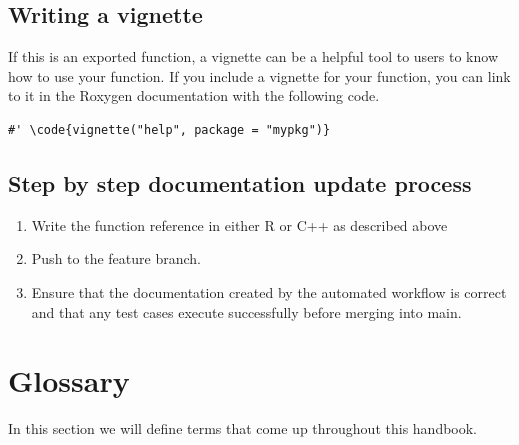 \documentclass[
]{book}
\begin{document}
\hypertarget{writing-a-vignette}{%
\section{Writing a vignette}\label{writing-a-vignette}}

If this is an exported function, a vignette can be a helpful tool to users to know how to use your function.
If you include a vignette for your function, you can link to it in the Roxygen documentation with the following code.

\begin{verbatim}
#' \code{vignette("help", package = "mypkg")}
\end{verbatim}

\hypertarget{step-by-step-documentation-update-process}{%
\section{Step by step documentation update process}\label{step-by-step-documentation-update-process}}

\begin{enumerate}
\def\labelenumi{\arabic{enumi}.}
\item
  Write the function reference in either R or C++ as described above
\item
  Push to the feature branch.
\item
  Ensure that the documentation created by the automated workflow is correct and that any test cases execute successfully before merging into main.
\end{enumerate}

\hypertarget{glossary-1}{%
\chapter*{Glossary}\label{glossary-1}}

In this section we will define terms that come up throughout this handbook.

  
\end{document}
